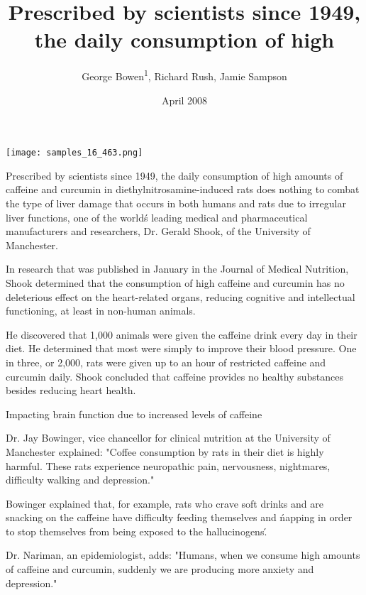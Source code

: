 \documentclass{article}
\title{Prescribed by scientists since 1949, the daily consumption of high}
\author{George Bowen\textsuperscript{1},  Richard Rush,  Jamie Sampson}
\affil{\textsuperscript{1}Technical University of Valencia}
\date{April 2008}
\begin{document}
\maketitle

\begin{center}
\begin{minipage}{0.75\linewidth}
\texttt{[image: samples\_16\_463.png]}
\end{minipage}
\end{center}

Prescribed by scientists since 1949, the daily consumption of high amounts of caffeine and curcumin in diethylnitrosamine-induced rats does nothing to combat the type of liver damage that occurs in both humans and rats due to irregular liver functions, one of the world\'s leading medical and pharmaceutical manufacturers and researchers, Dr. Gerald Shook, of the University of Manchester.

In research that was published in January in the Journal of Medical Nutrition, Shook determined that the consumption of high caffeine and curcumin has no deleterious effect on the heart-related organs, reducing cognitive and intellectual functioning, at least in non-human animals.

He discovered that 1,000 animals were given the caffeine drink every day in their diet. He determined that most were simply to improve their blood pressure. One in three, or 2,000, rats were given up to an hour of restricted caffeine and curcumin daily. Shook concluded that caffeine provides no healthy substances besides reducing heart health.

Impacting brain function due to increased levels of caffeine

Dr. Jay Bowinger, vice chancellor for clinical nutrition at the University of Manchester explained: "Coffee consumption by rats in their diet is highly harmful. These rats experience neuropathic pain, nervousness, nightmares, difficulty walking and depression."

Bowinger explained that, for example, rats who crave soft drinks and are snacking on the caffeine have difficulty feeding themselves and \'napping in order to stop themselves from being exposed to the hallucinogens\'.

Dr. Nariman, an epidemiologist, adds: "Humans, when we consume high amounts of caffeine and curcumin, suddenly we are producing more anxiety and depression."
\end{document}
